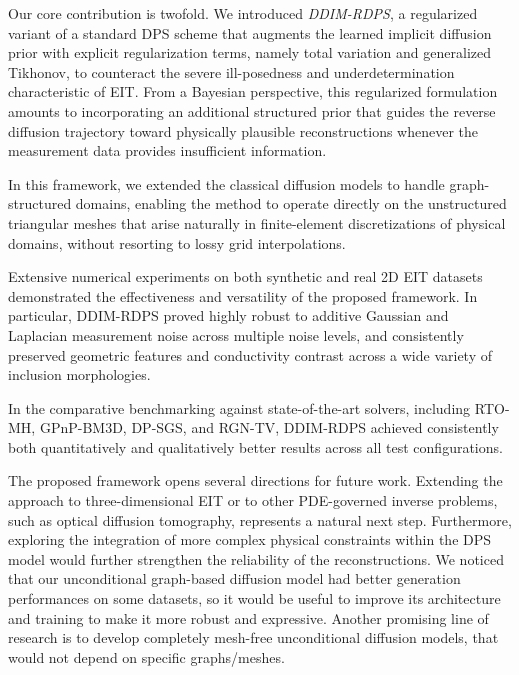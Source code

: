 \documentclass[a4paper,11pt]{article}
\theoremstyle{definition}
\theoremstyle{plain}
\theoremstyle{remark}
\begin{document}
Our core contribution is twofold. 
 We introduced
\emph{DDIM-RDPS}, a regularized variant of a standard DPS scheme that augments the learned
implicit diffusion prior with explicit regularization terms, namely total variation and generalized
Tikhonov, to counteract the severe ill-posedness and underdetermination characteristic of EIT. 
From a Bayesian perspective, this regularized formulation amounts to incorporating an additional
structured prior that guides the reverse diffusion trajectory toward physically plausible reconstructions
whenever the measurement data provides insufficient information.

In this framework, we extended the classical diffusion models to handle graph-structured
domains, enabling the method to operate directly on the unstructured triangular meshes that arise
naturally in finite-element discretizations of physical domains, without resorting to lossy grid
interpolations.
 
Extensive numerical experiments on both synthetic and real 2D EIT datasets demonstrated the
effectiveness and versatility of the proposed framework. In particular, DDIM-RDPS proved highly
robust to additive Gaussian and Laplacian measurement noise across multiple noise levels, and
consistently preserved geometric features and conductivity contrast across a wide variety of
inclusion morphologies. 

In the comparative benchmarking against state-of-the-art solvers, including RTO-MH, GPnP-BM3D,
DP-SGS, and RGN-TV, DDIM-RDPS achieved consistently both quantitatively and qualitatively better results across all test configurations. 



The proposed framework opens several directions for future work. Extending the approach to
three-dimensional EIT or to other PDE-governed inverse problems, such as  optical diffusion tomography, represents a natural next step. Furthermore,  exploring the integration of more complex physical constraints within the DPS model would further strengthen the reliability of the reconstructions. We noticed that our unconditional graph-based diffusion model had better generation performances on some datasets, so it would be useful to improve its architecture and training to make it more robust and expressive. Another promising line of research is to develop completely mesh-free unconditional diffusion models, that would not depend on specific graphs/meshes. 
\end{document}
